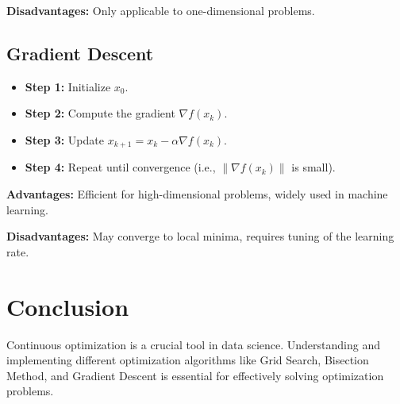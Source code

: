 \documentclass[]{article}
\begin{document}
	\textbf{Disadvantages:} Only applicable to one-dimensional problems.
	
	\subsection*{Gradient Descent}
	\begin{itemize}
		\item \textbf{Step 1:} Initialize $x_0$.
		\item \textbf{Step 2:} Compute the gradient $\nabla f(x_k)$.
		\item \textbf{Step 3:} Update $x_{k+1} = x_k - \alpha \nabla f(x_k)$.
		\item \textbf{Step 4:} Repeat until convergence (i.e., $\|\nabla f(x_k)\|$ is small).
	\end{itemize}
	\textbf{Advantages:} Efficient for high-dimensional problems, widely used in machine learning.
	
	\textbf{Disadvantages:} May converge to local minima, requires tuning of the learning rate.

    \section*{Conclusion}
	Continuous optimization is a crucial tool in data science. Understanding and implementing different optimization algorithms like Grid Search, Bisection Method, and Gradient Descent is essential for effectively solving optimization problems.
	
	
	
\end{document}
